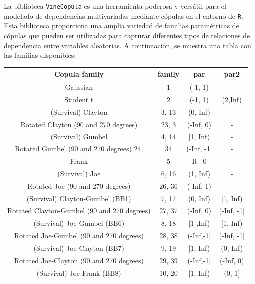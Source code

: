 La biblioteca \texttt{VineCopula} es una herramienta poderosa y versátil para el modelado de dependencias multivariadas mediante cópulas en el entorno de \texttt{R}. Esta biblioteca proporciona una amplia variedad de familias paramétricas de cópulas que pueden ser utilizadas para capturar diferentes tipos de relaciones de dependencia entre variables aleatorias. A continuación, se muestra una tabla con las familias disponibles:

\begin{table}[H]
    \centering
    \begin{tabular}{||c|c|c|c||}
    \hline\hline
\textbf{Copula family}	       & \textbf{family}    & \textbf{par}	    & \textbf{par2}      \\\hline
Gaussian	                                & 1	        & (-1, 1)	& -         \\
Student t	                                & 2	        & (-1, 1)	& (2,Inf)   \\
(Survival) Clayton	                        & 3, 13	    & (0, Inf)	& -         \\
Rotated Clayton (90 and 270 degrees)	    & 23, 3     & (-Inf, 0)	& -         \\
(Survival) Gumbel	                        & 4, 14	    & [1, Inf)	& -         \\
Rotated Gumbel (90 and 270 degrees)	24,     & 34	    & (-Inf, -1]& -         \\
Frank	                                    & 5	        & R \ {0}	& -         \\
(Survival) Joe	                            & 6, 16	    & (1, Inf)	& -         \\
Rotated Joe (90 and 270 degrees)	        & 26, 36    & (-Inf,-1)	& -         \\
(Survival) Clayton-Gumbel (BB1)	            & 7, 17	    & (0, Inf)	& [1, Inf)  \\
Rotated Clayton-Gumbel (90 and 270 degrees)	& 27, 37	& (-Inf, 0)	& (-Inf, -1]\\
(Survival) Joe-Gumbel (BB6)	                & 8, 18	    & [1 ,Inf)	& [1, Inf)  \\
Rotated Joe-Gumbel (90 and 270 degrees)	    & 28, 38	& (-Inf,-1]	& (-Inf, -1]\\
(Survival) Joe-Clayton (BB7)	            & 9, 19	    & [1, Inf)	& (0, Inf)  \\
Rotated Joe-Clayton (90 and 270 degrees)	& 29, 39	& (-Inf,-1]	& (-Inf, 0) \\
(Survival) Joe-Frank (BB8)	                & 10, 20	& [1, Inf)	& (0, 1]    \\

\end{tabular}
\end{table}
